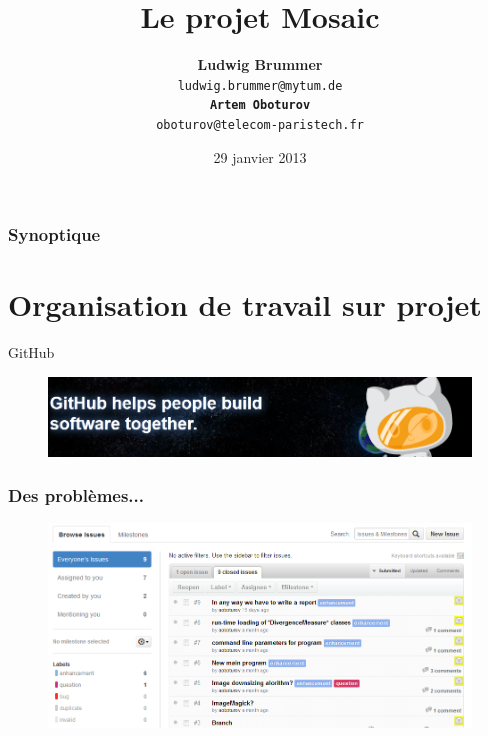 \documentclass[handout]{beamer}
\begin{document}
\title[Le projet Mosaic]
{\bf Le projet Mosaic \\
}
\author[ L. Brummer]{{\bf Ludwig Brummer}\\
\texttt{ludwig.brummer@mytum.de \\
\bf Artem Oboturov}\\
\texttt{oboturov@telecom-paristech.fr} \\
 }
\date{29 janvier 2013}

\begin{frame}
\titlepage
\end{frame}

\begin{frame}
\frametitle{\bf Synoptique} \tableofcontents
\end{frame}

















\section{Organisation de travail sur projet}

\begin{frame}
\begin{center}
{\Huge GitHub}
\end{center}
\begin{figure}[H]
\includegraphics[scale=0.50]{GitHub.png}
\end{figure}
\end{frame}

\begin{frame}
\frametitle{\bf Des probl\`emes...}
\begin{figure}[H]
\includegraphics[scale=0.36]{GitHubIssues.png}
\end{figure}
\end{frame}
\end{document}
